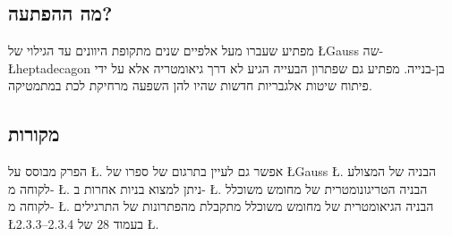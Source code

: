 \subsection*{מה ההפתעה?}

מפתיע שעברו מעל אלפיים שנים מתקופת היוונים עד הגילוי של 
\L{Gauss}
שה-%
\L{heptadecagon}
בן-בנייה. מפתיע גם שפתרון הבעייה הגיע לא דרך גיאומטריה אלא על ידי פיתוח שיטות אלגבריות חדשות שהיו להן השפעה מרחיקת לכת במתמטיקה.

\subsection*{מקורות}

הפרק מבוסס על
\L{\cite{jorg}}.
אפשר גם לעיין בתרגום של ספרו של 
\L{Gauss}
\L{\cite{gauss}}.
הבניה של המצולע לקוחה מ-%
\L{\cite{callagy}}.
ניתן למצוא בניות אחרות ב-%
\L{\cite{wiki:heptadecagon}}.
הבניה הטריגונומטרית של מחומש משוכלל לקוחה מ-%
\L{\cite{wiki:pentagon}}.
הבניה הגיאומטרית של מחומש משוכלל מתקבלת מהפתרונות של התרגילים
\L{2.3.3--2.3.4}
בעמוד
$28$
של
\L{\cite{stillwell}}.
